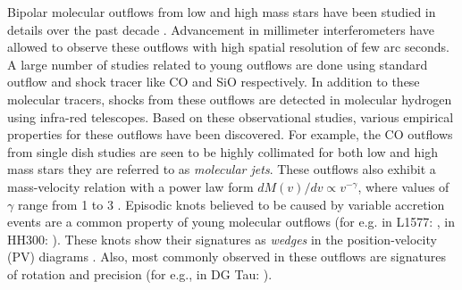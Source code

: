 \documentclass[useAMS,usenatbib,letters]{mn2e}
\begin{document}
Bipolar molecular outflows from low and high mass stars
have been studied in details over the past 
decade \citep[see reviews by][]{Bachiller:1996p4692,Arce:2007p798,
Tafalla:2011p14051}. Advancement in millimeter interferometers have
allowed to observe these outflows with high spatial resolution of
few arc seconds. A large number of studies related to young
outflows are done using standard outflow and shock tracer
like CO and SiO respectively. In addition to these molecular tracers,
shocks from these outflows are detected in molecular hydrogen using
infra-red telescopes. Based on these observational studies, various
empirical properties for these outflows have been discovered. For
example, the CO outflows from single dish studies are seen to be
highly collimated for both low and high mass stars
\citep[for e.g.,][]{Gueth:1999p4683, Beuther:2002p3574} they are
referred to as {\em{molecular jets}}. These outflows also exhibit a
mass-velocity relation with a power law form $ dM(v)/dv \propto
v^{-\gamma}$, where values of $\gamma$ range from 1 to 3 \cite{Downes:2003p9946}. Episodic
knots believed to be caused by variable accretion events are a common property
of young molecular outflows (for e.g. in L1577:
\citealt{Gueth:1998p14058}, in HH300: \citealt{Arce:2001p14064}). These knots show their signatures
as {\em{wedges}} in the position-velocity (PV) diagrams \cite{Arce:2001p14065}. Also, most
commonly observed in these outflows are signatures of rotation and
precision (for e.g., in DG Tau: \citealt{Bacciotti:2002p2084}).
%
\end{document}
